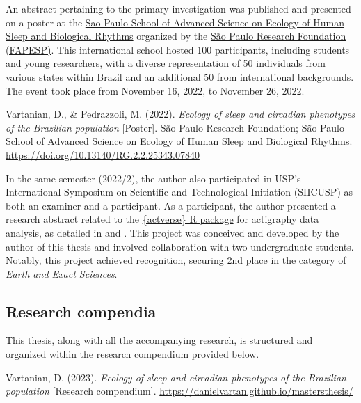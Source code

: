 \documentclass[
12pt,
openright,
oneside,
a4paper,
chapter=TITLE,
section=TITLE,
french,
spanish,
brazil,
english
]{abntex2}\usepackage{array}
\begin{document}
An abstract pertaining to the primary investigation was published and
presented on a poster at the
\href{https://espca.fapesp.br/school/sao_paulo_school_of_advanced_science_on_ecology_of_human_sleep_and_biological_rhythms/101/}{Sao
Paulo School of Advanced Science on Ecology of Human Sleep and
Biological Rhythms} organized by the \href{https://fapesp.br/en}{São
Paulo Research Foundation (FAPESP)}. This international school hosted
100 participants, including students and young researchers, with a
diverse representation of 50 individuals from various states within
Brazil and an additional 50 from international backgrounds. The event
took place from November 16, 2022, to November 26, 2022.

\smallskip

\noindent Vartanian, D., \& Pedrazzoli, M. (2022). \emph{Ecology of
sleep and circadian phenotypes of the Brazilian population}
{[}Poster{]}. São Paulo Research Foundation; São Paulo School of
Advanced Science on Ecology of Human Sleep and Biological Rhythms.
\url{https://doi.org/10.13140/RG.2.2.25343.07840}

\smallskip

In the same semester (2022/2), the author also participated in USP's
International Symposium on Scientific and Technological Initiation
(SIICUSP) as both an examiner and a participant. As a participant, the
author presented a research abstract related to the
\href{https://github.com/giperbio/actverse}{\{actverse\} R package} for
actigraphy data analysis, as detailed in \textcite{matias2022} and
\textcite{vartanian2022b}. This project was conceived and developed by
the author of this thesis and involved collaboration with two
undergraduate students. Notably, this project achieved recognition,
securing 2nd place in the category of \emph{Earth and Exact Sciences}.

\subsection{Research compendia}\label{research-compendia}

This thesis, along with all the accompanying research, is structured and
organized within the research compendium provided below.

\smallskip

\noindent Vartanian, D. (2023). \emph{Ecology of sleep and circadian
phenotypes of the Brazilian population} {[}Research compendium{]}.
\url{https://danielvartan.github.io/mastersthesis/}
\end{document}
